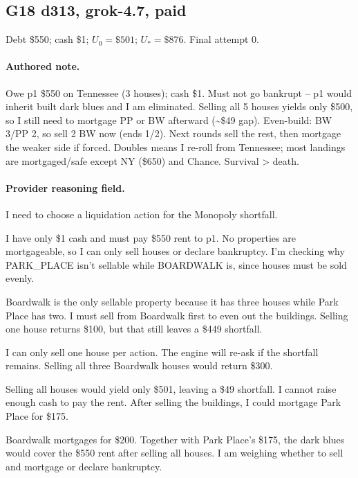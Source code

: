 \subsection*{G18 d313, grok-4.7, paid}

\noindent Debt \$550; cash \$1; $U_0=\$501$; $U_*=\$876$. Final attempt 0.\par

\paragraph{Authored note.} Owe p1 \$550 on Tennessee (3 houses); cash \$1. Must not go bankrupt  --  p1 would inherit built dark blues and I am eliminated. Selling all 5 houses yields only \$500, so I still need to mortgage PP or BW afterward (\textasciitilde{}\$49 gap). Even-build: BW 3/PP 2, so sell 2 BW now (ends 1/2). Next rounds sell the rest, then mortgage the weaker side if forced. Doubles means I re-roll from Tennessee; most landings are mortgaged/safe except NY (\$650) and Chance. Survival > death.

\paragraph{Provider reasoning field.} I need to choose a liquidation action for the Monopoly shortfall.

I have only \$1 cash and must pay \$550 rent to p1. No properties are mortgageable, so I can only sell houses or declare bankruptcy. I'm checking why PARK\_PLACE isn't sellable while BOARDWALK is, since houses must be sold evenly.

Boardwalk is the only sellable property because it has three houses while Park Place has two. I must sell from Boardwalk first to even out the buildings. Selling one house returns \$100, but that still leaves a \$449 shortfall.

I can only sell one house per action. The engine will re-ask if the shortfall remains. Selling all three Boardwalk houses would return \$300.

Selling all houses would yield only \$501, leaving a \$49 shortfall. I cannot raise enough cash to pay the rent. After selling the buildings, I could mortgage Park Place for \$175.

Boardwalk mortgages for \$200. Together with Park Place's \$175, the dark blues would cover the \$550 rent after selling all houses. I am weighing whether to sell and mortgage or declare bankruptcy.


